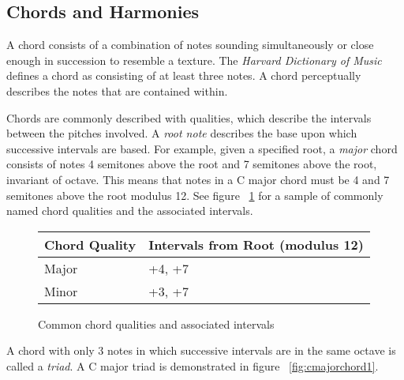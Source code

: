 \subsection{Chords and Harmonies}

A chord consists of a combination of notes sounding simultaneously or close enough in succession to resemble a texture. The \textit{Harvard Dictionary of Music} defines a chord as consisting of at least three notes\cite{harvdict}. A chord perceptually describes the notes that are contained within.

Chords are commonly described with qualities, which describe the intervals between the pitches involved. A \textit{root note} describes the base upon which successive intervals are based. For example, given a specified root, a \textit{major} chord consists of notes 4 semitones above the root and 7 semitones above the root, invariant of octave. This means that notes in a C major chord must be 4 and 7 semitones above the root modulus 12. See figure ~\ref{fig:qualitytable} for a sample of commonly named chord qualities and the associated intervals.

\begin{figure}[h!]
\begin{center}
\begin{tabular}{ll}
\toprule
Chord Quality    & Intervals from Root (modulus 12) \\
\midrule
Major      & +4, +7 \\
Minor      & +3, +7 \\
\bottomrule
\end{tabular}
\caption{Common chord qualities and associated intervals}
\label{fig:qualitytable}
\end{center}
\end{figure}

A chord with only 3 notes in which successive intervals are in the same octave is called a \textit{triad}. A C major triad is demonstrated in figure ~\ref{fig:cmajorchord1}.



